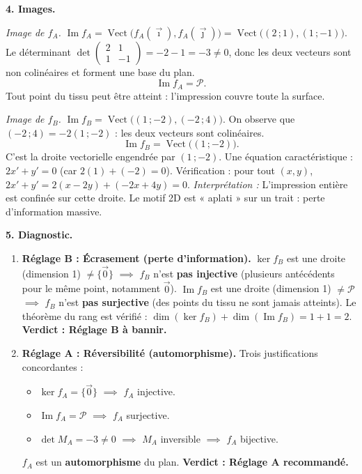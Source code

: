 \documentclass[11pt]{article}
\begin{document}
\begin{exoresolu}
\medskip

\textbf{4. Images.}

\emph{Image de $f_A$.} $\operatorname{Im} f_A = \operatorname{Vect}\bigl(f_A(\vec{\imath}), f_A(\vec{\jmath})\bigr) = \operatorname{Vect}\bigl((2\,;1), (1\,;-1)\bigr)$.
Le déterminant $\det\begin{pmatrix} 2 & 1 \\ 1 & -1 \end{pmatrix} = -2 - 1 = -3 \neq 0$, donc les deux vecteurs sont non colinéaires et forment une base du plan.
\[ \operatorname{Im} f_A = \mathcal{P}. \]
Tout point du tissu peut être atteint : l'impression couvre toute la surface.

\emph{Image de $f_B$.} $\operatorname{Im} f_B = \operatorname{Vect}\bigl((1\,;-2), (-2\,;4)\bigr)$.
On observe que $(-2\,;4) = -2(1\,;-2)$ : les deux vecteurs sont colinéaires.
\[ \operatorname{Im} f_B = \operatorname{Vect}\bigl((1\,;-2)\bigr). \]
C'est la droite vectorielle engendrée par $(1\,;-2)$. Une équation caractéristique : $2x' + y' = 0$ (car $2(1) + (-2) = 0$).
Vérification : pour tout $(x,y)$, $2x' + y' = 2(x-2y) + (-2x+4y) = 0$.
\textit{Interprétation :} L'impression entière est confinée sur cette droite. Le motif 2D est « aplati » sur un trait : perte d'information massive.

\medskip

\textbf{5. Diagnostic.}

\begin{enumerate}
\item \textbf{Réglage B : Écrasement (perte d'information).}
$\ker f_B$ est une droite (dimension 1) $\neq \{\vec{0}\}$ $\implies$ $f_B$ n'est \textbf{pas injective} (plusieurs antécédents pour le même point, notamment $\vec{0}$).
$\operatorname{Im} f_B$ est une droite (dimension 1) $\neq \mathcal{P}$ $\implies$ $f_B$ n'est \textbf{pas surjective} (des points du tissu ne sont jamais atteints).
Le théorème du rang est vérifié : $\dim(\ker f_B) + \dim(\operatorname{Im} f_B) = 1 + 1 = 2$.
\textbf{Verdict : Réglage B à bannir.}
\item \textbf{Réglage A : Réversibilité (automorphisme).} Trois justifications concordantes :
\begin{itemize}
\item $\ker f_A = \{\vec{0}\}$ $\implies$ $f_A$ injective.
\item $\operatorname{Im} f_A = \mathcal{P}$ $\implies$ $f_A$ surjective.
\item $\det M_A = -3 \neq 0$ $\implies$ $M_A$ inversible $\implies$ $f_A$ bijective.
\end{itemize}
$f_A$ est un \textbf{automorphisme} du plan.
\textbf{Verdict : Réglage A recommandé.}
\end{enumerate}


\end{exoresolu}
\end{document}
